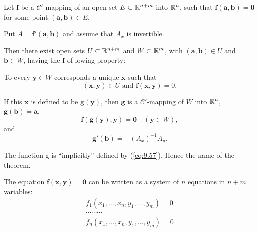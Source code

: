 
\begin{thm}
    \label{thm:9.28}
    Let $\mathbf{f}$ be a $\mathscr{C}'$-mapping of an open set 
    $E \subset {\protect\mathbb R}^{n+m}$ into ${\protect\mathbb R}^n$, 
    such that $\mathbf{f(a, b) = 0}$ for some point $(\mathbf{a, b}) \in E$.
    
    Put $A = \mathbf{f'(a, b)}$ and assume that $A_x$ is invertible.

    Then there exist open sets $U \subset {\protect\mathbb R}^{n+m}$ and $W \subset {\protect\mathbb R}^m$, 
    with $\mathbf{(a, b)} \in U$ and $\mathbf{b} \in W$, 
    having the $\mathbf{f}$ of lowing property:
    
    To every $\mathbf{y} \in W$ corresponds a unique $\mathbf{x}$ such that
    \begin{equation}
        \label{eq:9.56}
        \mathbf{(x, y)} \in U
        \text{ and }
        \mathbf{f(x, y)} = 0 .
    \end{equation}
    
    If this $\mathbf{x}$ is defined to be $\mathbf{g(y)}$, 
    then $\mathbf{g}$ is a $\mathscr{C}'$-mapping of $W$ into ${\protect\mathbb R}^n$, 
    $\mathbf{g(b) = a}$,
    \begin{equation}
        \label{eq:9.57}
        \mathbf{f(g(y), y) = 0}
        \quad
        (\mathbf{y} \in W) ,
    \end{equation}
    and 
    \begin{equation}
        \label{eq:9.58}
        \mathbf{g'(b)} = -(A_x)^{-1} A_y .
    \end{equation}
\end{thm}

The function g is ``implicitly'' defined by (\ref{eq:9.57}). 
Hence the name of the theorem.

The equation $\mathbf{f(x,y) = 0}$ can be written as a system of $n$ equations 
in $n+m$ variables:
\begin{equation}
    \label{eq:9.59}
    \begin{aligned}
        f_1(x_1,\dots,x_n,y_1,\dots,y_m) = 0 \\
        \cdots \cdots \cdots \\
        f_n(x_1,\dots,x_n,y_1,\dots,y_m) = 0 \\
    \end{aligned}
\end{equation}

